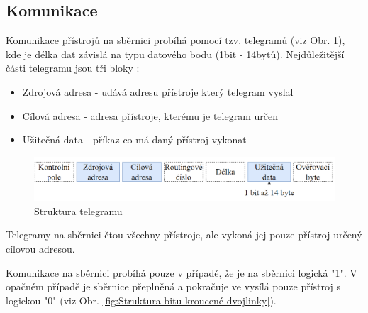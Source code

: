 \subsection{Komunikace}
Komunikace přístrojů na sběrnici probíhá pomocí tzv. telegramů (viz Obr. \ref{fig:Struktura telegramu}), kde je délka dat závislá na typu datového bodu  (1bit - 14bytů).
Nejdůležitější části telegramu jsou tři bloky \cite{Celkovy prehled}:
\begin{itemize}
\item Zdrojová adresa - udává adresu přístroje který telegram vyslal
\item Cílová adresa - adresa přístroje, kterému je telegram určen
\item Užitečná data - příkaz co má daný přístroj vykonat\\
\end{itemize}
\begin{figure}[!h]
  \begin{center}
    \includegraphics[scale=0.7]{obrazky/Struktura telegramu.png}
  \end{center}
  \caption[Struktura telegramu \cite{Celkovy prehled}]{Struktura telegramu \cite{Celkovy prehled}}
  \label{fig:Struktura telegramu}
\end{figure}
Telegramy na sběrnici čtou všechny přístroje, ale vykoná jej pouze přístroj určený cílovou adresou.

Komunikace na sběrnici probíhá pouze v případě, že je na sběrnici logická "1". V opačném případě je sběrnice přeplněná a pokračuje ve vysílá pouze přístroj s logickou "0" (viz Obr. \ref{fig:Struktura bitu kroucené dvojlinky}). \cite{Celkovy prehled}

